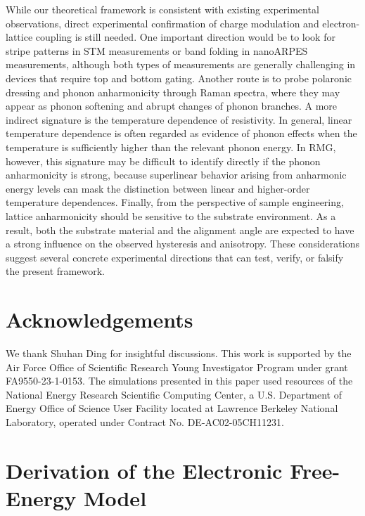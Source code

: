 \documentclass[aps,prx,article,twocolumn,amsmath,amssymb,superscriptaddress,longbibliography]{revtex4-2}
\begin{document}
While our theoretical framework is consistent with existing experimental observations, direct experimental confirmation of charge modulation and electron-lattice coupling is still needed. One important direction would be to look for stripe patterns in STM measurements or band folding in nanoARPES measurements, although both types of measurements are generally challenging in devices that require top and bottom gating. Another route is to probe polaronic dressing and phonon anharmonicity through Raman spectra, where they may appear as phonon softening and abrupt changes of phonon branches. A more indirect signature is the temperature dependence of resistivity. In general, linear temperature dependence is often regarded as evidence of phonon effects when the temperature is sufficiently higher than the relevant phonon energy. In RMG, however, this signature may be difficult to identify directly if the phonon anharmonicity is strong, because superlinear behavior arising from anharmonic energy levels can mask the distinction between linear and higher-order temperature dependences. Finally, from the perspective of sample engineering, lattice anharmonicity should be sensitive to the substrate environment. As a result, both the substrate material and the alignment angle are expected to have a strong influence on the observed hysteresis and anisotropy. These considerations suggest several concrete experimental directions that can test, verify, or falsify the present framework.



\section*{Acknowledgements}
We thank Shuhan Ding for insightful discussions. This work is supported by the Air Force Office of Scientific Research Young Investigator Program under grant FA9550-23-1-0153. The simulations presented in this paper used resources of the National Energy Research Scientific Computing Center, a U.S. Department of Energy Office of Science User Facility located at Lawrence Berkeley National Laboratory, operated under Contract No. DE-AC02-05CH11231.









\appendix



\section{Derivation of the Electronic Free-Energy Model}\label{app:derivationFreeEnergy}
\end{document}
